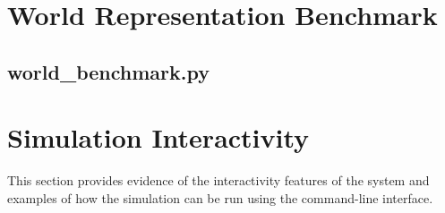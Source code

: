 \documentclass[12pt,a4paper]{report}
\begin{document}
\appendix

\chapter{World Representation Benchmark}

\section{world\_benchmark.py}
{\scriptsize}

\chapter{Simulation Interactivity}\label{chapter:simulation-interactivity}

This section provides evidence of the interactivity features of the system and examples of how the simulation can be run using the command-line interface.
\end{document}
